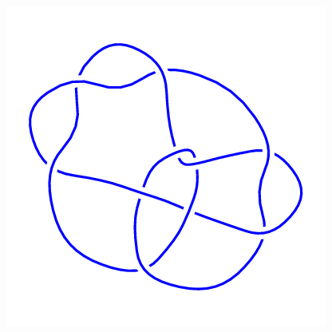 \begin{figure}[H]
\begin{minipage}[b]{.18\linewidth}
    \end{minipage}
    \begin{minipage}[b]{.18\linewidth}
        \centering
        \includegraphics[width=\linewidth]{../data/10_106.png}
    \end{minipage}
\end{figure}
